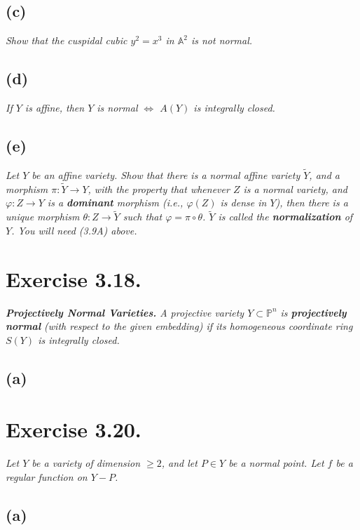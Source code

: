 \subsection{(c)}
\textit{Show that the cuspidal cubic $y^2=x^3$ in $\mathbb A^2$ is not normal.}

\subsection{(d)}
\textit{If $Y$ is affine, then $Y$ is normal $\Leftrightarrow$ $A(Y)$ is integrally closed.}

\subsection{(e)}
\textit{Let $Y$ be an affine variety. Show that there is a normal affine variety $\widetilde Y$, and a morphism $\pi: \widetilde Y\to Y$, with the property that whenever $Z$ is a normal variety, and $\varphi:Z\to Y$ is a \textbf{dominant} morphism (i.e., $\varphi(Z)$ is dense in $Y$), then there is a unique morphism $\theta:Z\to \widetilde Y$ such that $\varphi=\pi\circ\theta$. $\widetilde Y$ is called the \textbf{normalization} of $Y$. You will need (3.9A) above.}

\section{Exercise 3.18.}
\textit{\textbf{Projectively Normal Varieties.} A projective variety $Y\subset \mathbb P^n$ is \textbf{projectively normal} (with respect to the given embedding) if its homogeneous coordinate ring $S(Y)$ is integrally closed.}

\subsection{(a)}

\section{Exercise 3.20.}
\textit{Let $Y$ be a variety of dimension $\geq 2$, and let $P\in Y$ be a normal point. Let $f$ be a regular function on $Y-P$.}

\subsection{(a)}
